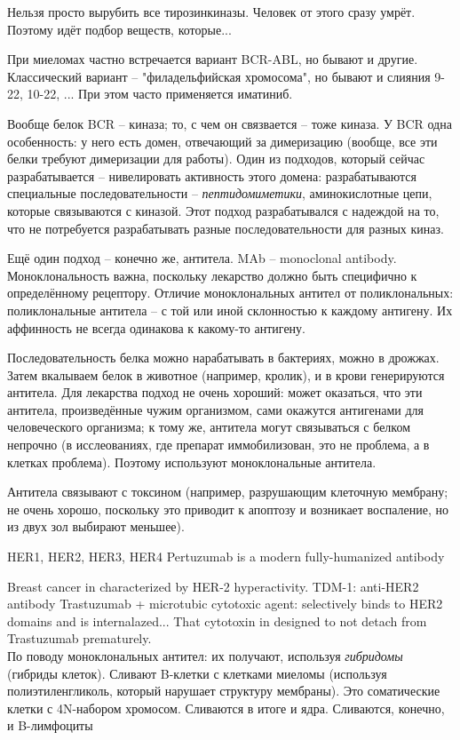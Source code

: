 \documentclass[main.tex]{subfiles}
\begin{document}
Нельзя просто вырубить все тирозинкиназы.
Человек от этого сразу умрёт.
Поэтому идёт подбор веществ, которые...

При миеломах частно встречается вариант BCR-ABL, но бывают и другие.
Классический вариант -- "филадельфийская хромосома", но бывают и слияния 9-22, 10-22, ...
При этом часто применяется иматиниб.

Вообще белок BCR -- киназа; то, с чем он связвается -- тоже киназа. У BCR одна особенность: у него есть домен, отвечающий за димеризацию (вообще, все эти белки требуют димеризации для работы).
Один из подходов, который сейчас разрабатывается -- нивелировать активность этого домена: разрабатываются специальные последовательности -- \emph{пептидомиметики}, аминокислотные цепи, которые связываются с киназой.
Этот подход разрабатывался с надеждой на то, что не потребуется разрабатывать разные последовательности для разных киназ.

Ещё один подход -- конечно же, антитела.
MAb -- monoclonal antibody.
Моноклональность важна, поскольку лекарство должно быть специфично к определённому рецептору.
Отличие моноклональных антител от поликлональных: поликлональные антитела -- с той или иной склонностью к каждому  антигену.
Их аффинность не всегда одинакова к какому-то антигену.

Последовательность белка можно нарабатывать в бактериях, можно в дрожжах.
Затем вкалываем белок в животное (например, кролик), и в крови генерируются антитела.
Для лекарства подход не очень хороший: может оказаться, что эти антитела, произведённые чужим организмом, сами окажутся антигенами для человеческого организма; к тому же, антитела могут связываться с белком непрочно (в исслеованиях, где препарат иммобилизован, это не проблема, а в клетках проблема).
Поэтому используют моноклональные антитела.

Антитела связывают с токсином (например, разрушающим клеточную мембрану; не очень хорошо, поскольку это приводит к апоптозу и возникает воспаление, но из двух зол выбирают меньшее).

HER1, HER2, HER3, HER4
Pertuzumab is a modern fully-humanized antibody

Breast cancer in characterized by HER-2 hyperactivity.
TDM-1: anti-HER2 antibody Trastuzumab
+ microtubic cytotoxic agent: selectively binds to HER2 domains and is internalazed...
That cytotoxin in designed to not detach from Trastuzumab prematurely. \\

По поводу моноклональных антител: их получают, используя \emph{гибридомы} (гибриды клеток).
Сливают B-клетки с клетками миеломы (используя полиэтиленгликоль, который нарушает структуру мембраны).
Это соматические клетки с 4N-набором хромосом.
Сливаются в итоге и ядра.
Сливаются, конечно, и B-лимфоциты 
\end{document}
